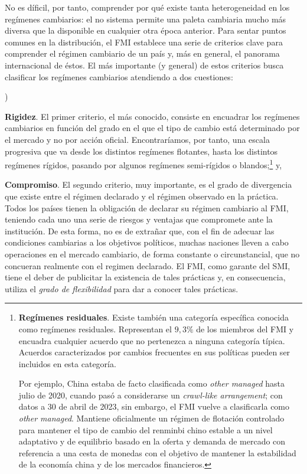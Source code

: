 \documentclass[10pt,a4paper]{article}
\newcounter{alphaitem}
\newenvironment{la}
      {\begin{list}{\alph{alphaitem})}{%
          \usecounter{alphaitem}%
          \setlength{\leftmargin}{1cm}%
          \setlength{\parskip}{3pt}%
          \setlength{\itemsep}{0pt}%
          \setlength{\parsep}{0pt}%
      }}
      {\end{list}}
\begin{document}
No es díficil, por tanto, comprender por qué existe tanta heterogeneidad en los regímenes cambiarios: el no sistema permite una paleta cambiaria mucho más diversa que la disponible en cualquier otra época anterior. Para sentar puntos comunes en la distribución, el FMI establece una serie de criterios clave para comprender el régimen cambiario de un país y, más en general, el panorama internacional de éstos. El más importante (y general) de estos criterios busca clasificar los regímenes cambiarios atendiendo a dos cuestiones:
\begin{la}
  \item \textbf{Rigidez}. El primer criterio, el más conocido, consiste en encuadrar los regímenes cambiarios en función del grado en el que el tipo de cambio está determinado por el mercado y no por acción oficial. Encontraríamos, por tanto, una escala progresiva que va desde los distintos regímenes flotantes, hasta los distintos regímenes rígidos, pasando por algunos regímenes semi-rígidos o blandos;\footnote{%
    \textbf{Regímenes residuales}. Existe también una categoría específica conocida como regímenes residuales. Representan el $9,3\%$ de los miembros del FMI y encuadra cualquier acuerdo que no pertenezca a ninguna categoría típica. Acuerdos caracterizados por cambios frecuentes en sus políticas pueden ser incluidos en esta categoría.

    Por ejemplo, China estaba de facto clasificada como \textit{other managed} hasta julio de 2020, cuando pasó a considerarse un \textit{crawl-like arrangement}; con datos a 30 de abril de 2023, sin embargo, el FMI vuelve a clasificarla como \textit{other managed}. Mantiene oficialmente un régimen de flotación controlado para mantener el tipo de cambio del renminbi chino estable a un nivel adaptativo y de equilibrio basado en la oferta y demanda de mercado con referencia a una cesta de monedas con el objetivo de mantener la estabilidad de la economía china y de los mercados financieros.
  } y,
  \item \textbf{Compromiso}. El segundo criterio, muy importante, es el grado de divergencia que existe entre el régimen declarado y el régimen observado en la práctica. Todos los países tienen la obligación de declarar su régimen cambiario al FMI, teniendo cada uno una serie de riesgos y ventajas que compromete ante la institución. De esta forma, no es de extrañar que, con el fin de adecuar las condiciones cambiarias a los objetivos políticos, muchas naciones lleven a cabo operaciones en el mercado cambiario, de forma constante o circunstancial, que no concueran realmente con el regimen declarado. El FMI, como garante del SMI, tiene el deber de publicitar la existencia de tales prácticas y, en consecuencia, utiliza el \textit{grado de flexibilidad} para dar a conocer tales prácticas.
\end{la}
\end{document}
